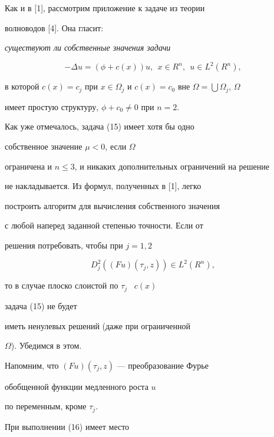 Как и в [1], рассмотрим приложение к задаче из теории


волноводов [4]. Она гласит:


{\em существуют ли собственные значения задачи\/} \label{WG}


\begin{equation}


-\Delta u = (\phi + c(x)) u , \ \ x \in R^{n}, \ \ u\in L^{2}(R^{n}), 


\end{equation}


в которой $c(x)= c_{j}$ при $x \in \Omega_{j}$ и $c(x)


= c_{0}$ вне $\Omega =\bigcup \Omega_{j}$, $\Omega $


имеет простую структуру, $\phi+c_0\ne0$ при $n=2$. 





Как уже отмечалось, задача (15) имеет хотя бы одно


собственное значение $\mu < 0$, если $\Omega$


ограничена и $n\le3$, и никаких дополнительных ограничений на решение


не накладывается. Из формул, полученных в [1], легко


построить алгоритм для вычисления собственного значения


с любой наперед заданной степенью точности. Если от


решения потребовать, чтобы при $j=1, 2$


\begin{equation}


D_{j}^{2}((Fu)(\tau_{j}, z)) \in L^{2}(R^{n}), 


\end{equation}


то в случае плоско слоистой по $\tau_{j}$ \ $c(x)$


задача (15) не будет


иметь ненулевых решений (даже при ограниченной


$\Omega$). Убедимся в этом. 





Напомним, что $(Fu)(\tau_{j}, z)$ --- преобразование Фурье


обобщенной функции медленного роста $u$


по переменным, кроме $\tau_{j}$. 


При выполнении (16) имеет место


